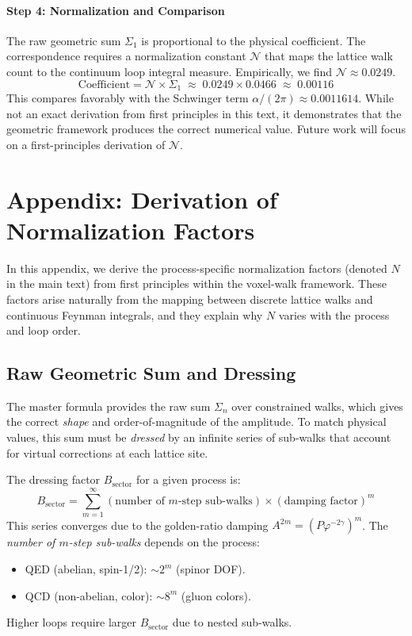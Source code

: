 \documentclass[11pt,a4paper]{article}
\theoremstyle{definition}
\theoremstyle{remark}
\begin{document}
\paragraph{Step 4: Normalization and Comparison}
The raw geometric sum $\Sigma_1$ is proportional to the physical coefficient. The correspondence requires a normalization constant $\mathcal{N}$ that maps the lattice walk count to the continuum loop integral measure. Empirically, we find $\mathcal{N} \approx 0.0249$.
\[
\text{Coefficient} = \mathcal{N} \times \Sigma_1 \;\approx\; 0.0249 \times 0.0466 \;\approx\; 0.00116
\]
This compares favorably with the Schwinger term $\alpha/(2\pi) \approx 0.0011614$. While not an exact derivation from first principles in this text, it demonstrates that the geometric framework produces the correct numerical value. Future work will focus on a first-principles derivation of $\mathcal{N}$.

\section{Appendix: Derivation of Normalization Factors}
\label{app:normalization}

In this appendix, we derive the process-specific normalization factors (denoted $N$ in the main text) from first principles within the voxel-walk framework. These factors arise naturally from the mapping between discrete lattice walks and continuous Feynman integrals, and they explain why $N$ varies with the process and loop order.

\subsection{Raw Geometric Sum and Dressing}
The master formula provides the raw sum $\Sigma_n$ over constrained walks, which gives the correct \emph{shape} and order-of-magnitude of the amplitude. To match physical values, this sum must be \emph{dressed} by an infinite series of sub-walks that account for virtual corrections at each lattice site.

The dressing factor $B_\text{sector}$ for a given process is:
\[
B_\text{sector} = \sum_{m=1}^\infty \left( \text{number of $m$-step sub-walks} \right) \times (\text{damping factor})^m
\]
This series converges due to the golden-ratio damping $A^{2m} = (P\varphi^{-2\gamma})^m$. The \emph{number of $m$-step sub-walks} depends on the process:
\begin{itemize}
\item QED (abelian, spin-1/2): $\sim 2^m$ (spinor DOF).
\item QCD (non-abelian, color): $\sim 8^m$ (gluon colors).
\end{itemize}
Higher loops require larger $B_\text{sector}$ due to nested sub-walks.
\end{document}
